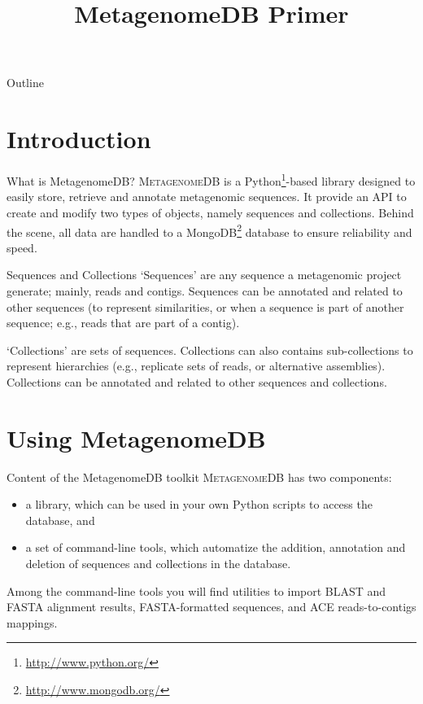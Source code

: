 \documentclass[handout]{beamer}
\title[MetagenomeDB Primer]{MetagenomeDB Primer}
\date[November 5, 2010]
\begin{document}
\begin{frame}
	\titlepage
\end{frame}

\begin{frame}{Outline}
	\tableofcontents
\end{frame}


\section{Introduction}

\begin{frame}{What is MetagenomeDB?}
	\textsc{MetagenomeDB} is a Python\footnote{\url{http://www.python.org/}}-based library designed to easily store, retrieve and annotate metagenomic sequences. It provide an API to create and modify two types of objects, namely sequences and collections. Behind the scene, all data are handled to a MongoDB\footnote{\url{http://www.mongodb.org/}} database to ensure reliability and speed.
\end{frame}

\begin{frame}{Sequences and Collections}
	`Sequences' are any sequence a metagenomic project generate; mainly, reads and contigs. Sequences can be annotated and related to other sequences (to represent similarities, or when a sequence is part of another sequence; e.g., reads that are part of a contig).

	\bigskip
	`Collections' are sets of sequences. Collections can also contains sub-collections to represent hierarchies (e.g., replicate sets of reads, or alternative assemblies). Collections can be annotated and related to other sequences and collections.
\end{frame}

\section{Using MetagenomeDB}

\begin{frame}{Content of the MetagenomeDB toolkit}
	\textsc{MetagenomeDB} has two components:
	\begin{itemize}
		\item a library, which can be used in your own Python scripts to access the database, and
		\item a set of command-line tools, which automatize the addition, annotation and deletion of sequences and collections in the database.
	\end{itemize}

	\medskip
	Among the command-line tools you will find utilities to import BLAST and FASTA alignment results, FASTA-formatted sequences, and ACE reads-to-contigs mappings.
\end{frame}
\end{document}
